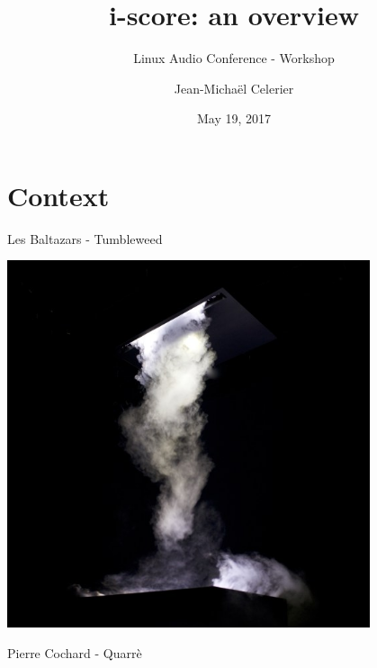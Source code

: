 \documentclass[handout]{beamer}
\author{Jean-Michaël Celerier}
\title{i-score: an overview}
\subtitle{Linux Audio Conference - Workshop}
\date{May 19, 2017}
\begin{document}
\begin{frame}
\maketitle
\end{frame}
\begin{frame}
\Large
\tableofcontents
\end{frame}

\section{Context}

\begin{frame}
\centering
\Huge Les Baltazars - Tumbleweed
\end{frame}

\begin{frame}
\centering
\vspace{-1mm}

\includegraphics[width=0.8\textwidth]{images/tumbleweed.jpg}
\end{frame}

\begin{frame}
\centering
\Huge Pierre Cochard - Quarrè
\end{frame}
\end{document}
